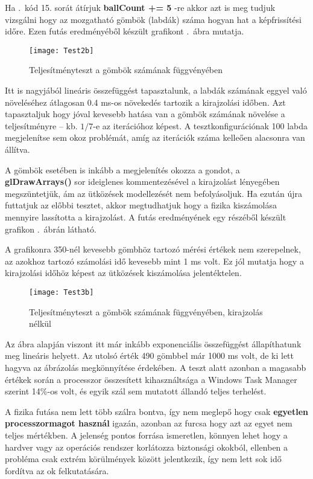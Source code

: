 Ha .~kód 15. sorát átírjuk \textbf{ballCount += 5} -re akkor azt is meg tudjuk vizsgálni hogy az mozgatható gömbök (labdák) száma hogyan hat a képfrissítési időre. Ezen futás eredményéből készült grafikont .~ábra mutatja.

\begin{figure}[H]
	\centering
	\texttt{[image: Test2b]}
	\caption{Teljesítményteszt a gömbök számának függvényében}
	\label{fig:Test2}
\end{figure}

Itt is nagyjából lineáris összefüggést tapasztalunk, a labdák számának eggyel való növeléséhez átlagosan 0.4 ms-os növekedés tartozik a kirajzolási időben. Azt tapasztaljuk hogy jóval kevesebb hatása van a gömbök számának növelése a teljesítményre -- kb. $1/7$-e az iterációhoz képest. A tesztkonfigurációnak 100 labda megjelenítse sem okoz problémát, amíg az iterációk száma kelleően alacsonra van állítva.

A gömbök esetében is inkább a megjelenítés okozza a gondot, a \textbf{glDrawArrays()} sor ideiglenes kommentezésével a kirajzolást lényegében megszüntetjük, ám az ütközések modellezését nem befolyásoljuk. Ha ezután újra futtatjuk az előbbi tesztet, akkor megtudhatjuk hogy a fizika kiszámolása mennyire lassította a kirajzolást. A futás eredményének egy részéből készült grafikon .~ábrán látható. 

A grafikonra 350-nél kevesebb gömbhöz tartozó mérési értékek nem szerepelnek, az azokhoz tartozó számolási idő kevesebb mint 1 ms volt. Ez jól mutatja hogy a kirajzolási időhöz képest az ütközések kiszámolása jelentéktelen.

\begin{figure}[H]
	\centering
	\texttt{[image: Test3b]}
	\caption{Teljesítményteszt a gömbök számának függvényében, kirajzolás nélkül}
	\label{fig:Test3}
\end{figure}

Az ábra alapján viszont itt már inkább exponenciális összefüggést állapíthatunk meg lineáris helyett. Az utolsó érték 490 gömbbel már 1000 ms volt, de ki lett hagyva az ábrázolás megkönnyítése érdekében. A teszt alatt azonban a magasabb értékek során a processzor összesített kihasználtsága a Windows Task Manager szerint 14\%-os volt, és egyik szál sem mutatott állandó teljes terhelést. 

A fizika futása nem lett több szálra bontva, így nem meglepő hogy csak \textbf{egyetlen processzormagot használ} igazán, azonban az furcsa hogy azt az egyet nem teljes mértékben. A jelenség pontos forrása ismeretlen, könnyen lehet hogy a hardver vagy az operációs rendszer korlátozza biztonsági okokból, ellenben a probléma csak extrém körülmények között jelentkezik, így nem lett sok idő fordítva az ok felkutatására. 

